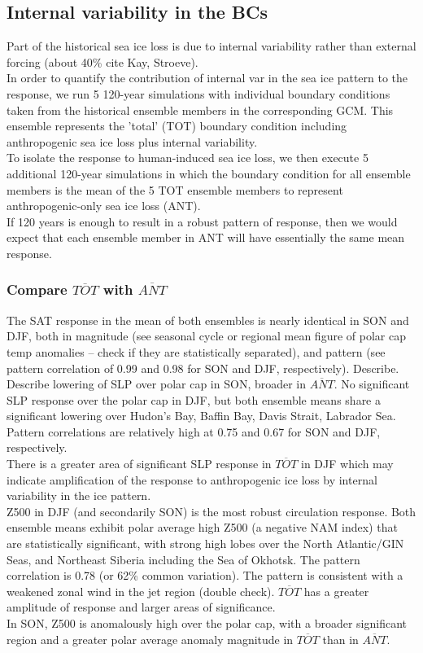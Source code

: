 \documentclass[twocol]{ametsoc}
\begin{document}
\subsection{Internal variability in the BCs}

Part of the historical sea ice loss is due to internal variability rather than external forcing (about 40\% cite Kay, Stroeve). \\
In order to quantify the contribution of internal var in the sea ice pattern to the response, we run 5 120-year simulations with individual boundary conditions taken from the historical ensemble members in the corresponding GCM. This ensemble represents the 'total' (TOT) boundary condition including anthropogenic sea ice loss plus internal variability. \\
To isolate the response to human-induced sea ice loss, we then execute 5 additional 120-year simulations in which the boundary condition for all ensemble members is the mean of the 5 TOT ensemble members to represent anthropogenic-only sea ice loss (ANT).\\
If 120 years is enough to result in a robust pattern of response, then we would expect that each ensemble member in ANT will have essentially the same mean response.

\subsubsection{Compare $\overline{TOT}$ with $\overline{ANT}$}

The SAT response in the mean of both ensembles is nearly identical in SON and DJF, both in magnitude (see seasonal cycle or regional mean figure of polar cap temp anomalies -- check if they are statistically separated), and pattern (see pattern correlation of 0.99 and 0.98 for SON and DJF, respectively). Describe.\\
Describe lowering of SLP over polar cap in SON, broader in $\overline{ANT}$. No significant SLP response over the polar cap in DJF, but both ensemble means share a significant lowering over Hudon's Bay, Baffin Bay, Davis Strait, Labrador Sea. Pattern correlations are relatively high at 0.75 and 0.67 for SON and DJF, respectively.\\
There is a greater area of significant SLP response in $\overline{TOT}$ in DJF which may indicate amplification of the response to anthropogenic ice loss by internal variability in the ice pattern.\\
Z500 in DJF (and secondarily SON) is the most robust circulation response. Both ensemble means exhibit polar average high Z500 (a negative NAM index) that are statistically significant, with strong high lobes over the North Atlantic/GIN Seas, and Northeast Siberia including the Sea of Okhotsk. The pattern correlation is 0.78 (or 62\% common variation). The pattern is consistent with a weakened zonal wind in the jet region (double check). $\overline{TOT}$ has a greater amplitude of response and larger areas of significance. \\
In SON, Z500 is anomalously high over the polar cap, with a broader significant region and a greater polar average anomaly magnitude in $\overline{TOT}$ than in $\overline{ANT}$. \\
\end{document}
